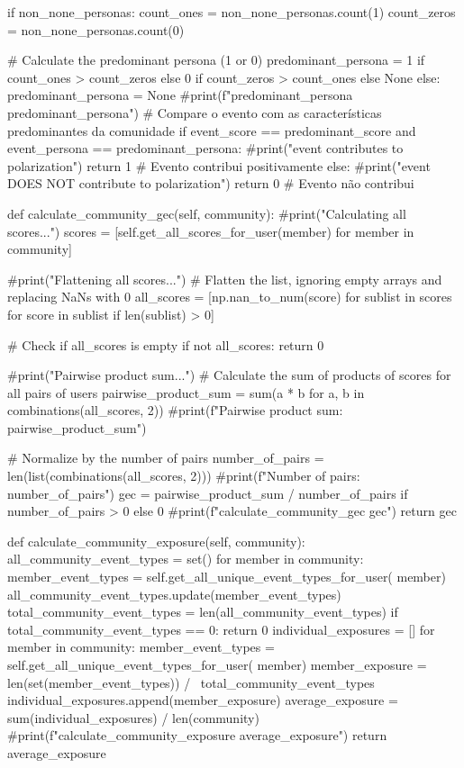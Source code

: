 \begin{codigo}[caption={Exemplo de classe Python para deteção de câmaras de eco}, label={codigo:echochamberdetector}, language=Python, breaklines=true]
        if non_none_personas:
            count_ones = non_none_personas.count(1)
            count_zeros = non_none_personas.count(0)

            # Calculate the predominant persona (1 or 0)
            predominant_persona = 1 if count_ones > count_zeros else 0 if count_zeros > count_ones else None
        else:
            predominant_persona = None
        #print(f"predominant_persona {predominant_persona}")
        # Compare o evento com as características predominantes da comunidade
        if event_score == predominant_score and event_persona == predominant_persona:
            #print("event contributes to polarization")
            return 1  # Evento contribui positivamente
        else:
            #print("event DOES NOT contribute to polarization")
            return 0  # Evento não contribui

    def calculate_community_gec(self, community):
        #print("Calculating all scores...")
        scores = [self.get_all_scores_for_user(member) for member in community]

        #print("Flattening all scores...")
        # Flatten the list, ignoring empty arrays and replacing NaNs with 0
        all_scores = [np.nan_to_num(score) for sublist in scores for score in sublist if len(sublist) > 0]

        # Check if all_scores is empty
        if not all_scores:
            return 0

        #print("Pairwise product sum...")
        # Calculate the sum of products of scores for all pairs of users
        pairwise_product_sum = sum(a * b for a, b in combinations(all_scores, 2))
        #print(f"Pairwise product sum: {pairwise_product_sum}")

        # Normalize by the number of pairs
        number_of_pairs = len(list(combinations(all_scores, 2)))
        #print(f"Number of pairs: {number_of_pairs}")
        gec = pairwise_product_sum / number_of_pairs if number_of_pairs > 0 else 0
        #print(f"calculate_community_gec {gec}")
        return gec

    def calculate_community_exposure(self, community):
        all_community_event_types = set()
        for member in community:
            member_event_types = self.get_all_unique_event_types_for_user(
                member)
            all_community_event_types.update(member_event_types)
        total_community_event_types = len(all_community_event_types)
        if total_community_event_types == 0:
            return 0
        individual_exposures = []
        for member in community:
            member_event_types = self.get_all_unique_event_types_for_user(
                member)
            member_exposure = len(set(member_event_types)) / \
                total_community_event_types
            individual_exposures.append(member_exposure)
        average_exposure = sum(individual_exposures) / len(community)
        #print(f"calculate_community_exposure {average_exposure}")
        return average_exposure


\end{codigo}
